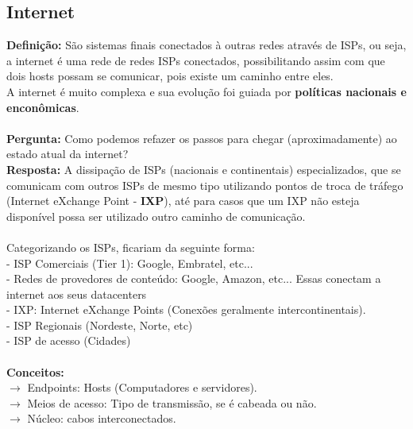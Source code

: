 \documentclass[12pt]{article}
\begin{document}
    \subsection{Internet}
    \textbf{Definição:} São sistemas finais conectados à outras redes através de ISPs, ou seja, a internet é uma rede de redes ISPs conectados, possibilitando assim com que dois hosts possam se comunicar, pois existe um caminho entre eles.
    \\A internet é muito complexa e sua evolução foi guiada por \textbf{políticas nacionais e enconômicas}. 
    \\~\\\textbf{Pergunta:} Como podemos refazer os passos para chegar (aproximadamente) ao estado atual da internet?
    \\\textbf{Resposta:} A dissipação de ISPs (nacionais e continentais) especializados, que se comunicam com outros ISPs de mesmo tipo utilizando pontos de troca de tráfego (Internet eXchange Point - \textbf{IXP}), até para casos que um IXP não esteja disponível possa ser utilizado outro caminho de comunicação.
    \\~\\Categorizando os ISPs, ficariam da seguinte forma:
    \\- ISP Comerciais (Tier 1): Google, Embratel, etc...
    \\- Redes de provedores de conteúdo: Google, Amazon, etc... {Essas conectam a internet aos seus datacenters}
    \\- IXP: Internet eXchange Points (Conexões geralmente intercontinentais).
    \\- ISP Regionais (Nordeste, Norte, etc)
    \\- ISP de acesso (Cidades)
    \\~\\\textbf{Conceitos:}
    \\$\rightarrow$ Endpoints: Hosts (Computadores e servidores).
    \\$\rightarrow$ Meios de acesso: Tipo de transmissão, se é cabeada ou não.
    \\$\rightarrow$ Núcleo: cabos interconectados.
\end{document}
